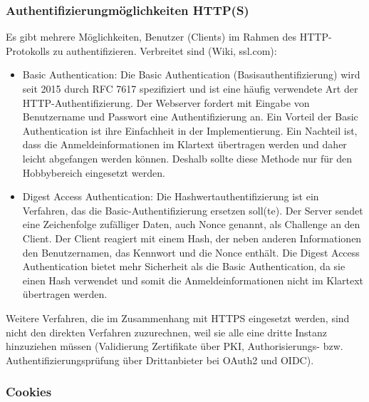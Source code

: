 \documentclass[notitlepage, hidelinks]{article}
\begin{document}
\subsubsection{Authentifizierungmöglichkeiten HTTP(S)}
Es gibt mehrere Möglichkeiten, Benutzer (Clients) im Rahmen des HTTP-Protokolls zu authentifizieren. Verbreitet sind (Wiki, ssl.com):
\begin{itemize}
\item Basic Authentication: Die Basic Authentication (Basisauthentifizierung) wird seit 2015 durch RFC 7617 spezifiziert und ist eine häufig verwendete Art der HTTP-Authentifizierung. Der Webserver fordert mit Eingabe von Benutzername und Passwort eine Authentifizierung an. Ein Vorteil der Basic Authentication ist ihre Einfachheit in der Implementierung. Ein Nachteil ist, dass die Anmeldeinformationen im Klartext übertragen werden und daher leicht abgefangen werden können. Deshalb sollte diese Methode nur für den Hobbybereich eingesetzt werden.
\item Digest Access Authentication: Die Hashwertauthentifizierung ist ein Verfahren, das die Basic-Authentifizierung ersetzen soll(te). Der Server sendet eine Zeichenfolge zufälliger Daten, auch Nonce genannt, als Challenge an den Client. Der Client reagiert mit einem Hash, der neben anderen Informationen den Benutzernamen, das Kennwort und die Nonce enthält. Die Digest Access Authentication bietet mehr Sicherheit als die Basic Authentication, da sie einen Hash verwendet und somit die Anmeldeinformationen nicht im Klartext übertragen werden.
\end{itemize}

Weitere Verfahren, die im Zusammenhang mit HTTPS eingesetzt werden, sind nicht den direkten Verfahren zuzurechnen, weil sie alle eine dritte Instanz hinzuziehen müssen (Validierung Zertifikate über PKI, Authorisierungs- bzw. Authentifizierungsprüfung über Drittanbieter bei OAuth2 und OIDC).

\subsubsection{Cookies}
\end{document}
